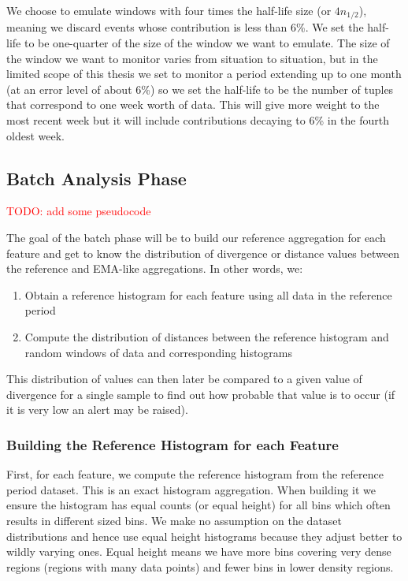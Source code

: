 We choose to emulate windows with four times the half-life size (or $4n_{1/2}$), meaning we discard events whose contribution is less than 6\%. We set the half-life to be one-quarter of the size of the window we want to emulate. The size of the window we want to monitor varies from situation to situation, but in the limited scope of this thesis we set to monitor a period extending up to one month (at an error level of about 6\%) so we set the half-life to be the number of tuples that correspond to one week worth of data. This will give more weight to the most recent week but it will include contributions decaying to 6\% in the fourth oldest week.

\subsection{Batch Analysis Phase} \label{sec:batch-phase}
\textcolor{red}{TODO: add some pseudocode}

The goal of the batch phase will be to build our reference aggregation for each feature and get to know the distribution of divergence or distance values between the reference and EMA-like aggregations. In other words, we:

\begin{enumerate}
    \item Obtain a reference histogram for each feature using all data in the reference period
    
    \item Compute the distribution of distances between the reference histogram and random windows of data and corresponding histograms
\end{enumerate}

This distribution of values can then later be compared to a given value of divergence for a single sample to find out how probable that value is to occur (if it is very low an alert may be raised).

\subsubsection*{Building the Reference Histogram for each Feature}

First, for each feature, we compute the reference histogram from the reference period dataset. This is an exact histogram aggregation. When building it we ensure the histogram has equal counts (or equal height) for all bins which often results in different sized bins. We make no assumption on the dataset distributions and hence use equal height histograms because they adjust better to wildly varying ones. Equal height means we have more bins covering very dense regions (regions with many data points) and fewer bins in lower density regions. 


